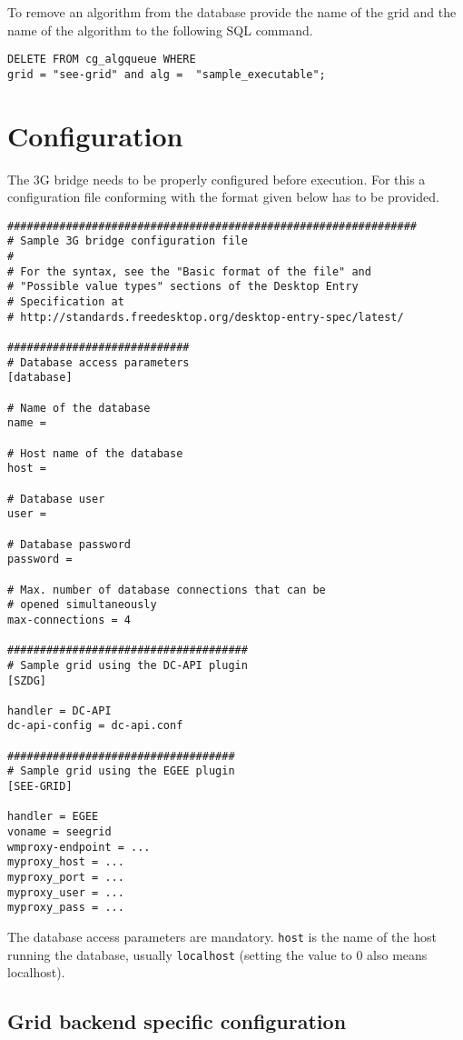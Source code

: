 \documentclass[a4paper, 12pt]{article}
\begin{document}
To remove an algorithm from the database provide the name of the grid and the name of the algorithm to   the following SQL command.

\begin{verbatim}
DELETE FROM cg_algqueue WHERE
grid = "see-grid" and alg =  "sample_executable";
\end{verbatim}

\section{Configuration}

The 3G bridge needs to be properly configured before execution. For this a configuration file conforming with the format given below has to be provided. 

\begin{verbatim}
###############################################################
# Sample 3G bridge configuration file
#
# For the syntax, see the "Basic format of the file" and 
# "Possible value types" sections of the Desktop Entry 
# Specification at
# http://standards.freedesktop.org/desktop-entry-spec/latest/

############################
# Database access parameters
[database]

# Name of the database
name =

# Host name of the database
host =

# Database user
user =

# Database password
password =

# Max. number of database connections that can be 
# opened simultaneously
max-connections = 4

#####################################
# Sample grid using the DC-API plugin
[SZDG]

handler = DC-API
dc-api-config = dc-api.conf

###################################
# Sample grid using the EGEE plugin
[SEE-GRID]

handler = EGEE
voname = seegrid
wmproxy-endpoint = ...
myproxy_host = ...
myproxy_port = ...
myproxy_user = ...
myproxy_pass = ...

\end{verbatim}

The database access parameters are mandatory. {\tt host} is the name of the host running the database, usually {\tt localhost} (setting the value to 0 also means localhost). 

\subsection{Grid backend specific configuration}
\end{document}

